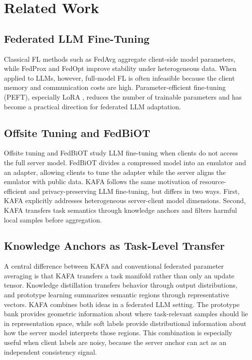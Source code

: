 \documentclass[conference]{IEEEtran}
\begin{document}
\section{Related Work}
\subsection{Federated LLM Fine-Tuning}
Classical FL methods such as FedAvg \cite{fedavg} aggregate client-side model parameters, while FedProx \cite{fedprox} and FedOpt \cite{fedopt} improve stability under heterogeneous data. When applied to LLMs, however, full-model FL is often infeasible because the client memory and communication costs are high. Parameter-efficient fine-tuning (PEFT), especially LoRA \cite{lora}, reduces the number of trainable parameters and has become a practical direction for federated LLM adaptation.

\subsection{Offsite Tuning and FedBiOT}
Offsite tuning \cite{offsite} and FedBiOT \cite{fedbiot} study LLM fine-tuning when clients do not access the full server model. FedBiOT divides a compressed model into an emulator and an adapter, allowing clients to tune the adapter while the server aligns the emulator with public data. KAFA follows the same motivation of resource-efficient and privacy-preserving LLM fine-tuning, but differs in two ways. First, KAFA explicitly addresses heterogeneous server-client model dimensions. Second, KAFA transfers task semantics through knowledge anchors and filters harmful local samples before aggregation.


\subsection{Knowledge Anchors as Task-Level Transfer}
A central difference between KAFA and conventional federated parameter averaging is that KAFA transfers a task manifold rather than only an update tensor. Knowledge distillation transfers behavior through output distributions, and prototype learning summarizes semantic regions through representative vectors. KAFA combines both ideas in a federated LLM setting. The prototype bank provides geometric information about where task-relevant samples should lie in representation space, while soft labels provide distributional information about how the server model interprets those regions. This combination is especially useful when client labels are noisy, because the server anchor can act as an independent consistency signal.
\end{document}
